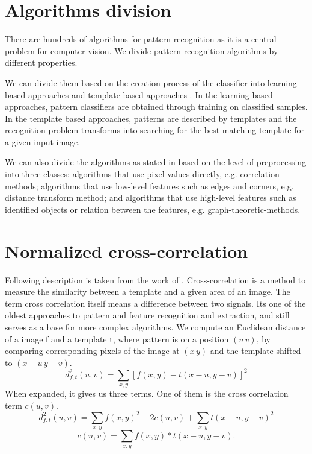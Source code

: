 \section{Algorithms division}
There are hundreds of algorithms for pattern recognition as it is a central problem for computer vision. We divide pattern recognition algorithms by different properties.

We can divide them based on the creation process of the classifier into learning-based approaches and template-based approaches \cite{skeletonMatching}. In the learning-based approaches, pattern classifiers are obtained through training on classified samples. In the template based approaches, patterns are described by templates and the recognition problem transforms into searching for the best matching template for a given input image.

We can also divide the algorithms as stated in \cite{distanceTransform} based on the level of preprocessing into three classes: algorithms that use pixel values directly, e.g. correlation methods; algorithms that use low-level features such as edges and corners, e.g. distance transform method; and algorithms that use high-level features such as identified objects or relation between the features, e.g. graph-theoretic-methods.

\section{Normalized cross-correlation}
Following description is taken from the work of \cite{crossCorrLewis}.
Cross-correlation is a method to measure the similarity between a template and a given area of an image. The term cross correlation itself means a difference between two signals. Its one of the oldest approaches to pattern and feature recognition and extraction, and still serves as a base for more complex algorithms.
We compute an Euclidean distance of a image f and a template t, where pattern is on a position $(u\,v)$, by comparing corresponding pixels of the image at $(x\,y)$ and the template shifted to $(x-u\,y-v)$. 
\begin{equation*}
d_{f,t}^{2}(u,v)=\sum_{x,y} [ f(x,y) - t(x-u, y-v) ]^{2} 
\end{equation*}
When expanded, it gives us three terms. One of them is the cross correlation term $c(u,v)$.
\begin{equation*}
d_{f,t}^{2}(u,v)=\sum_{x,y} f(x,y)^{2} - 2c(u,v) + \sum_{x,y} t(x-u, y-v)^2
\end{equation*}
\begin{equation*}
c(u,v)=\sum_{x,y} f(x,y) * t(x-u, y-v).
\end{equation*}

